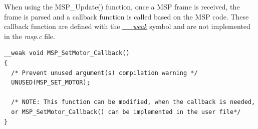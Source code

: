 \documentclass[a4paper,12pt,oneside]{book}
\begin{document}
When using the {MSP{\_}Update()} function, once a MSP frame is received, the frame is parsed and a callback function is called based on the MSP code. These callback function are defined with the \href{http://www.keil.com/support/man/docs/armcc/armcc_chr1359124970859.htm}{\textit{{\_\_}weak}} symbol and are not implemented in the \textit{msp.c} file.\\

\begin{verbatim}
__weak void MSP_SetMotor_Callback()
{
  /* Prevent unused argument(s) compilation warning */
  UNUSED(MSP_SET_MOTOR);
  
  /* NOTE: This function can be modified, when the callback is needed,
  or MSP_SetMotor_Callback() can be implemented in the user file*/
}
\end{verbatim}

\bigskip
\end{document}
